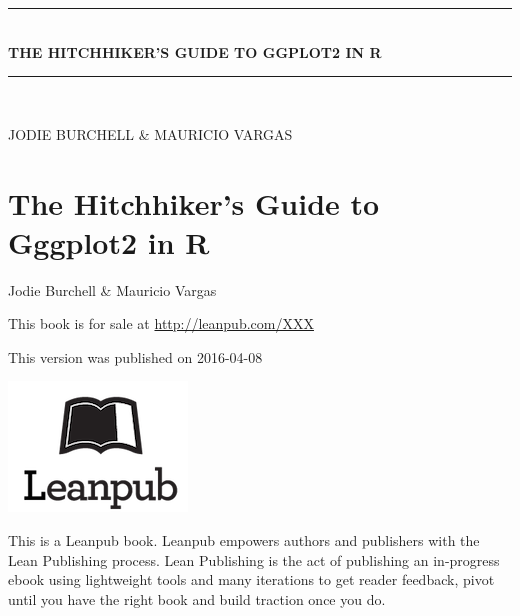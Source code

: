 \documentclass[10pt, oneside]{report}
\begin{document}
\begin{center} \end{center} %
\cleardoublepage

\newcommand{\HRule}{\rule{\linewidth}{0.5mm}}
\begin{titlepage}
{\sffamily 
	\begin{center}
		\vspace*{\fill}
		\HRule \\[0.4cm]{
		\huge \bfseries THE HITCHHIKER'S GUIDE TO GGPLOT2 IN R}\\ [0.4cm]
		\HRule \\[1.5cm]
		\begin{minipage}{0.9\textwidth}
		\begin{center}
		\large
		JODIE BURCHELL \& MAURICIO VARGAS
		\end{center}
		\end{minipage}
	\vfill
	\end{center}}
\end{titlepage}
\setcounter{page}{2}
\setlength\parindent{0pt} %
\renewcommand{\labelenumi}{\alph{enumi}.} %
\newpage

\chapter*{The Hitchhiker's Guide to Gggplot2 in R}

Jodie Burchell \& Mauricio Vargas

This book is for sale at \href{http://leanpub.com/XXX}{http://leanpub.com/XXX} 

This version was published on 2016-04-08

\includegraphics[scale=0.5]{leanpub}

This is a Leanpub book. Leanpub empowers authors and publishers with the Lean Publishing process. Lean Publishing is the act of publishing an in-progress ebook using lightweight tools and many iterations to get reader feedback, pivot until you have the right book and build traction once you do.
\end{document}
